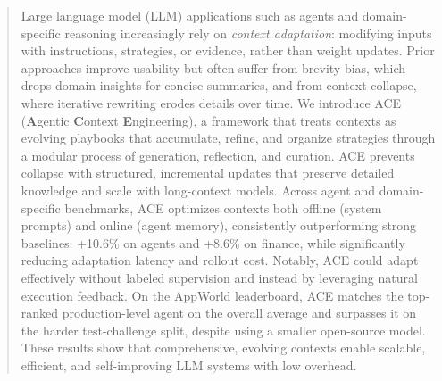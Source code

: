 \begin{abstract}
Large language model (LLM) applications such as agents and domain-specific reasoning increasingly rely on \emph{context adaptation}: modifying inputs with instructions, strategies, or evidence, rather than weight updates. 
Prior approaches improve usability but often suffer from brevity bias, which drops domain insights for concise summaries, and from context collapse, where iterative rewriting erodes details over time. 
We introduce ACE (\textbf{A}gentic \textbf{C}ontext \textbf{E}ngineering), a framework that treats contexts as evolving playbooks that accumulate, refine, and organize strategies through a modular process of generation, reflection, and curation. 
ACE prevents collapse with structured, incremental updates that preserve detailed knowledge and scale with long-context models.
Across agent and domain-specific benchmarks, ACE optimizes contexts both offline (\eg system prompts) and online (\eg agent memory), consistently outperforming strong baselines: +10.6\% on agents and +8.6\% on finance, while significantly reducing adaptation latency and rollout cost. 
Notably, ACE could adapt effectively without labeled supervision and instead by leveraging natural execution feedback. 
On the AppWorld leaderboard, ACE matches the top-ranked production-level agent on the overall average and surpasses it on the harder test-challenge split, despite using a smaller open-source model.
These results show that comprehensive, evolving contexts enable scalable, efficient, and self-improving LLM systems with low overhead.
\end{abstract}